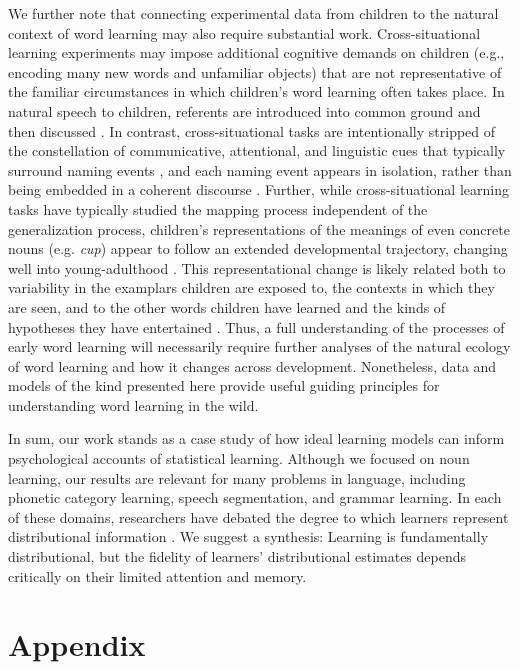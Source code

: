 \documentclass[man,floatsintext]{apa6}
\begin{document}
We further note that connecting experimental data from children to the natural context of word learning may also require substantial work. Cross-situational learning experiments may impose additional cognitive demands on children (e.g., encoding many new words and unfamiliar objects) that are not representative of the familiar circumstances in which children's word learning often takes place. In natural speech to children, referents are introduced into common ground and then discussed \cite{Clark2003}. In contrast, cross-situational tasks are intentionally stripped of the constellation of communicative, attentional, and linguistic cues that typically surround naming events \cite{Frank2013a, Gogate2010, Mintz2003}, and each naming event appears in isolation, rather than being embedded in a coherent discourse \cite{Frank2013a, Rohde2014}. Further, while cross-situational learning tasks have typically studied the mapping process independent of the generalization process, children's representations of the meanings of even concrete nouns (e.g. \emph{cup}) appear to follow an extended developmental trajectory, changing well into young-adulthood \cite{ameel2008}. This representational change is likely related both to variability in the examplars children are exposed to, the contexts in which they are seen, and to the other words children have learned and the kinds of hypotheses they have entertained \cite{hidaka2010,Dautriche2014}. Thus, a full understanding of the processes of early word learning will necessarily require further analyses of the natural ecology of word learning and how it changes across development. Nonetheless, data and models of the kind presented here provide useful guiding principles for understanding word learning in the wild.

In sum, our work stands as a case study of how ideal learning models can inform psychological accounts of statistical learning. Although we focused on noun learning, our results are relevant for many problems in language, including phonetic category learning, speech segmentation, and grammar learning. In each of these domains, researchers have debated the degree to which learners represent distributional information \cite{Endress2005, Frank2010a, McMurray2013}. We suggest a synthesis: Learning is fundamentally distributional, but the fidelity of learners' distributional estimates depends critically on their limited attention and memory.

\section{Appendix}
\end{document}
